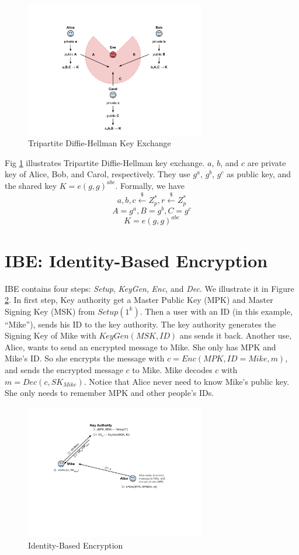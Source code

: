 \begin{figure}
\label{fig:3dh}
\centering
  \includegraphics[width=0.7\textwidth]{Old Scribe Notes/fig2.pdf}
\caption{Tripartite Diffie-Hellman Key Exchange}
\end{figure}

Fig \ref{fig:3dh} illustrates Tripartite Diffie-Hellman key exchange. $a$, $b$, and $c$ are private key of Alice, Bob, and Carol, respectively.
They use $g^a$, $g^b$, $g^c$ as public key, and the shared key $K=e(g,g)^{abc}$.
Formally, we have
$$a,b,c \stackrel{\$}{\gets} Z^*_p, r \stackrel{\$}{\gets} Z^*_p$$
$$A=g^a, B=g^b, C=g^c$$
$$K=e(g,g)^{abc}$$



\section{IBE: Identity-Based Encryption}
IBE contains four steps: \emph{Setup}, \emph{KeyGen}, \emph{Enc}, and \emph{Dec}. We illustrate it in Figure \ref{fig:ibe}.
In first step, Key authority get a Master Public Key (MPK) and Master Signing Key (MSK) from $Setup(1^k)$. Then a user with an ID
 (in this example, ``Mike''), sends his ID to the key authority. The key authority generates the Signing Key of Mike with $KeyGen(MSK, ID)$ ans sends it back. Another use, Alice, wants to send an encrypted message to Mike. She only has MPK and Mike's ID. So she encrypts the message with $c=Enc(MPK, ID=Mike, m)$, and sends the encrypted message $c$ to Mike. Mike decodes $c$ with $m=Dec(c, SK_{Mike})$. Notice that Alice never need to know Mike's public key. She only needs to remember MPK and other people's IDs.

\begin{figure}
\label{fig:ibe}
\centering
  \includegraphics[width=0.7\textwidth]{Old Scribe Notes/fig3.pdf}
\caption{Identity-Based Encryption}
\end{figure}

